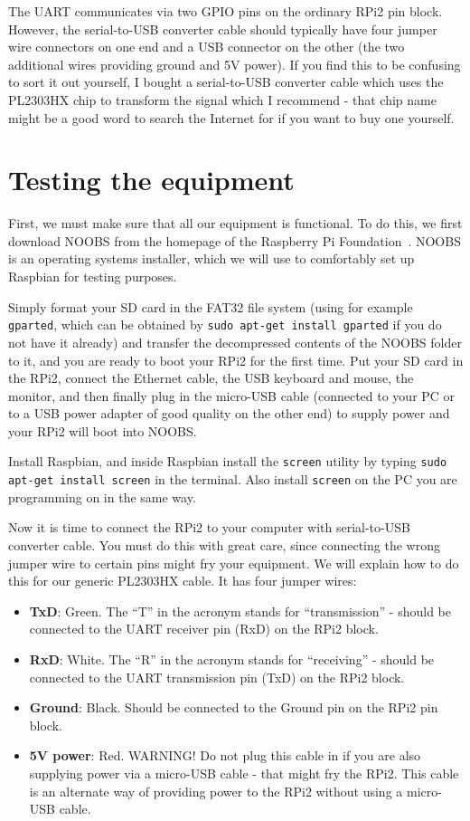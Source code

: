 \documentclass[a4paper,11pt,reqno]{amsart}
\begin{document}
The UART communicates via two GPIO pins on the ordinary RPi2 pin block. However, the serial-to-USB converter cable should typically have four jumper wire connectors on one end and a USB connector on the other (the two additional wires providing ground and 5V power). If you find this to be confusing to sort it out yourself, I bought a serial-to-USB converter cable which uses the PL2303HX chip to transform the signal which I recommend - that chip name might be a good word to search the Internet for if you want to buy one yourself.

\section{Testing the equipment}
First, we must make sure that all our equipment is functional. To do this, we first download NOOBS from the homepage of the Raspberry Pi Foundation~\cite{noobs}. NOOBS is an operating systems installer, which we will use to comfortably set up Raspbian for testing purposes.

Simply format your SD card in the FAT32 file system (using for example \texttt{gparted}, which can be obtained by \texttt{sudo apt-get install gparted} if you do not have it already) and transfer the decompressed contents of the NOOBS folder to it, and you are ready to boot your RPi2 for the first time. Put your SD card in the RPi2, connect the Ethernet cable, the USB keyboard and mouse, the monitor, and then finally plug in the micro-USB cable (connected to your PC or to a USB power adapter of good quality on the other end) to supply power and your RPi2 will boot into NOOBS.

Install Raspbian, and inside Raspbian install the \texttt{screen} utility by typing \texttt{sudo apt-get install screen} in the terminal. Also install \texttt{screen} on the PC you are programming on in the same way.

Now it is time to connect the RPi2 to your computer with serial-to-USB converter cable. You must do this with great care, since connecting the wrong jumper wire to certain pins might fry your equipment. We will explain how to do this for our generic PL2303HX cable. It has four jumper wires:

\begin{itemize}
  \item \textbf{TxD}: Green. The ``T'' in the acronym stands for ``transmission'' - should be connected to the UART receiver pin (RxD) on the RPi2 block.
  \item \textbf{RxD}: White. The ``R'' in the acronym stands for ``receiving'' - should be connected to the UART transmission pin (TxD) on the RPi2 block.
  \item \textbf{Ground}: Black. Should be connected to the Ground pin on the RPi2 pin block.
  \item \textbf{5V power}: Red. WARNING! Do not plug this cable in if you are also supplying power via a micro-USB cable - that might fry the RPi2. This cable is an alternate way of providing power to the RPi2 without using a micro-USB cable.
\end{itemize}
\end{document}
